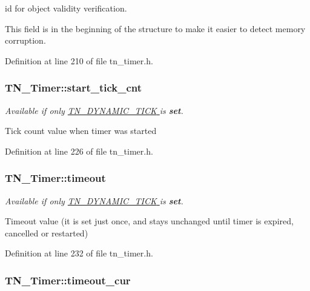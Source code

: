 id for object validity verification. 

This field is in the beginning of the structure to make it easier to detect memory corruption. 

Definition at line 210 of file tn\+\_\+timer.\+h.

\hypertarget{structTN__Timer_ab1410fa78c9099a6bc4dd3f43f1f52e4}{
\subsubsection[{start\+\_\+tick\+\_\+cnt}]{ T\+N\+\_\+\+Timer\+::start\+\_\+tick\+\_\+cnt}}\label{structTN__Timer_ab1410fa78c9099a6bc4dd3f43f1f52e4}


{\itshape Available if only \hyperlink{tn__cfg__default_8h_aaee875834a86f961318c584095c366fe}{{\ttfamily T\+N\+\_\+\+D\+Y\+N\+A\+M\+I\+C\+\_\+\+T\+I\+C\+K} } is {\bfseries set}.} 

Tick count value when timer was started 

Definition at line 226 of file tn\+\_\+timer.\+h.

\hypertarget{structTN__Timer_a893c5b01ec38bdcbcf2294cc950ffd09}{
\subsubsection[{timeout}]{ T\+N\+\_\+\+Timer\+::timeout}}\label{structTN__Timer_a893c5b01ec38bdcbcf2294cc950ffd09}


{\itshape Available if only \hyperlink{tn__cfg__default_8h_aaee875834a86f961318c584095c366fe}{{\ttfamily T\+N\+\_\+\+D\+Y\+N\+A\+M\+I\+C\+\_\+\+T\+I\+C\+K} } is {\bfseries set}.} 

Timeout value (it is set just once, and stays unchanged until timer is expired, cancelled or restarted) 

Definition at line 232 of file tn\+\_\+timer.\+h.

\hypertarget{structTN__Timer_a6041c660dad74778f668bac9ae844465}{
\subsubsection[{timeout\+\_\+cur}]{ T\+N\+\_\+\+Timer\+::timeout\+\_\+cur}}\label{structTN__Timer_a6041c660dad74778f668bac9ae844465}


